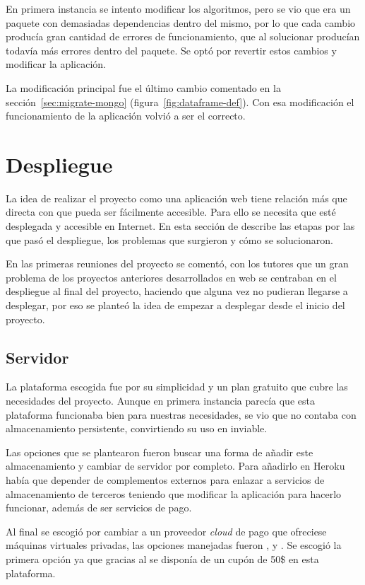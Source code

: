 En primera instancia se intento modificar los algoritmos, pero se vio que era un
paquete con demasiadas dependencias dentro del mismo, por lo que cada cambio 
producía gran cantidad de errores de funcionamiento, que al solucionar 
producían todavía más errores dentro del paquete. Se optó por revertir estos
cambios y modificar la aplicación.

La modificación principal fue el último cambio comentado en la 
sección~\ref{sec:migrate-mongo} (figura~\ref{fig:dataframe-def}). Con esa 
modificación el funcionamiento de la aplicación volvió a ser el correcto.

\section{Despliegue}\label{sec:despliegue}

La idea de realizar el proyecto como una aplicación web tiene relación más que
directa con que pueda ser fácilmente accesible. Para ello se necesita que
esté desplegada y accesible en Internet. En esta sección de describe las etapas
por las que pasó el despliegue, los problemas que surgieron y cómo se
solucionaron.

En las primeras reuniones del proyecto se comentó, con los tutores que un gran
problema de los proyectos anteriores desarrollados en web se centraban en el
despliegue al final del proyecto, haciendo que alguna vez no pudieran llegarse a
desplegar, por eso se planteó la idea de empezar a desplegar desde el inicio del
proyecto.

\subsection{Servidor}

La plataforma escogida fue 
por su simplicidad y un plan gratuito que cubre las necesidades del proyecto.
Aunque en primera instancia parecía que esta plataforma funcionaba bien para
nuestras necesidades, se vio que no contaba con almacenamiento persistente,
convirtiendo su uso en inviable.

Las opciones que se plantearon fueron buscar una forma de añadir este
almacenamiento y cambiar de servidor por completo. Para añadirlo en Heroku había
que depender de complementos externos para enlazar a servicios de 
almacenamiento de terceros teniendo que modificar la aplicación para hacerlo
funcionar, además de ser servicios de pago.

Al final se escogió por cambiar a un proveedor \textit{cloud} de pago que
ofreciese máquinas virtuales privadas, las opciones manejadas fueron
,
 y
. Se escogió la primera
opción ya que gracias al
 se
disponía de un cupón de 50\$ en esta plataforma.

